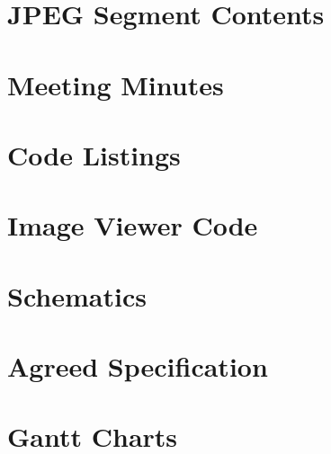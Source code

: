 \documentclass[oneside]{ecsgdp}         %
\begin{document}



\newpage

\appendix
\chapter{JPEG Segment Contents}
\label{chap:jpeg-segment-contents}

\chapter{Meeting Minutes}

\newpage
\chapter{Code Listings}
\label{chap:Matlab_code}

\newpage
\chapter{Image Viewer Code}

\newpage

\newpage

\newpage
\chapter{Schematics}


\newpage

\chapter{Agreed Specification}

\newpage

\chapter{Gantt Charts}

\newpage

\backmatter



\end{document}
